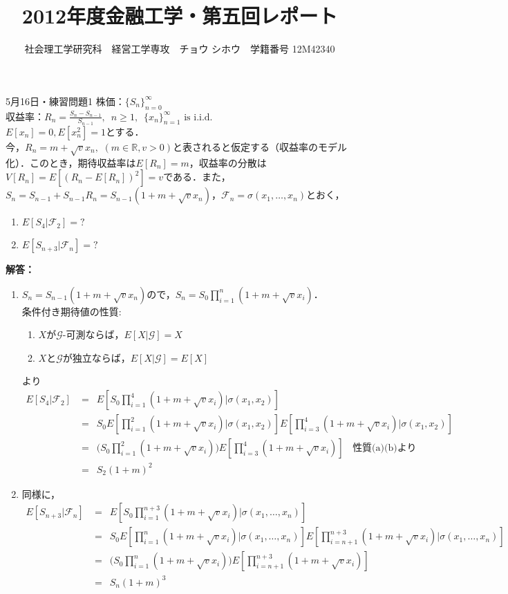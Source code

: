 \documentclass{jsarticle}
\begin{document}
\title{2012年度金融工学・第五回レポート}
\author{{\normalsize 社会理工学研究科　経営工学専攻　チョウ シホウ　学籍番号 12M42340}}
\date{}
\maketitle

\def \Pr{{\rm Pr}}


\baselineskip 0.6cm

\begin{itembox}[l]{5月16日・練習問題1}
株価：$\{ S_n \}_{n=0}^\infty$\\
収益率：$R_n = \frac{S_n - S_{n-1}}{S_{n-1}}, \,\,\, n \ge 1,\,\,\, \{x_n\}_{n=1}^\infty \text{ is i.i.d.}$\\
$E[x_n]=0,E[x_n^2]=1$とする．\\
今，$R_n = m + \sqrt{v} x_n, \,\,(m \in \mathbb{R},v>0)$と表されると仮定する（収益率のモデル化）．このとき，期待収益率は$E[R_n]=m$，収益率の分散は$V[R_n]=E[(R_n-E[R_n])^2]=v$である．また，$S_n=S_{n-1}+S_{n-1}R_n=S_{n-1}(1+m+\sqrt{v}x_n)$，$\mathcal{F}_n = \sigma(x_1,\dots,x_n)$とおく，
\begin{enumerate}
\item $E[S_4|\mathcal{F}_2]=?$
\item $E[S_{n+3}|\mathcal{F}_n]=?$
\end{enumerate}
\end{itembox}
{\bf 解答：}
\begin{enumerate}
\item
$S_n=S_{n-1}(1+m+\sqrt{v}x_n)$ので，$S_n=S_0\prod_{i=1}^n (1+m+\sqrt{v}x_i)$．\\
条件付き期待値の性質:
\begin{enumerate}
\item $X$が$\mathcal{G}$-可測ならば，$E[X|\mathcal{G}] =X$
\item $X$と$\mathcal{G}$が独立ならば，$E[X|\mathcal{G}] = E[X]$
\end{enumerate}
より
\[
\begin{split}
E[S_4|\mathcal{F}_2] &=\,\,\, E[S_0\prod_{i=1}^4 (1+m+\sqrt{v}x_i) | \sigma(x_1,x_2)]\\
&=\,\,\, S_0E[\prod_{i=1}^2 (1+m+\sqrt{v}x_i) | \sigma(x_1,x_2)]E[\prod_{i=3}^4 (1+m+\sqrt{v}x_i) | \sigma(x_1,x_2)]\\
&=\,\,\, \Bigr( S_0\prod_{i=1}^2 (1+m+\sqrt{v}x_i) \Bigr) E[\prod_{i=3}^4(1+m+\sqrt{v}x_i)] \,\,\,\,\ \text{性質(a)(b)より} \\
&=\,\,\, S_2(1+m)^2
\end{split}
\]
\item 同様に，
\[
\begin{split}
E[S_{n+3}|\mathcal{F}_n] &=\,\,\, E[S_0\prod_{i=1}^{n+3} (1+m+\sqrt{v}x_i) | \sigma(x_1,\dots,x_n)]\\
&=\,\,\, S_0E[\prod_{i=1}^n (1+m+\sqrt{v}x_i) | \sigma(x_1,\dots,x_n)]E[\prod_{i=n+1}^{n+3} (1+m+\sqrt{v}x_i) | \sigma(x_1,\dots,x_n)]\\
&=\,\,\, \Bigr( S_0\prod_{i=1}^n (1+m+\sqrt{v}x_i) \Bigr) E[\prod_{i=n+1}^{n+3} (1+m+\sqrt{v}x_i)]\\
&=\,\,\, S_n(1+m)^3
\end{split}
\]
\end{enumerate}
\end{document}
